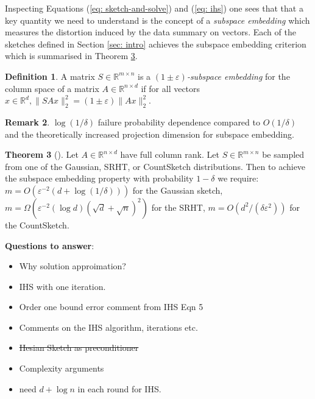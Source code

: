 \documentclass[twoside]{article}
\newcommand{\R}{\mathbb{R}}
\newcommand{\eps}{\varepsilon}
\theoremstyle{definition}\newtheorem{thm}{Theorem}[section]
\theoremstyle{definition}\newtheorem{mydef}[thm]{Definition}
\theoremstyle{definition}\newtheorem{rem}[thm]{Remark}
\theoremstyle{definition}\newtheorem{prop}[thm]{Proposition}
\theoremstyle{definition}\newtheorem{example}[thm]{Example}
\theoremstyle{definition}\newtheorem{claim}[thm]{Claim}
\theoremstyle{definition}\newtheorem{Qu}[thm]{Question}
\theoremstyle{definition}\newtheorem{Lemma}[thm]{Lemma}
\theoremstyle{definition}\newtheorem{Cor}[thm]{Corollary}
\theoremstyle{definition}\newtheorem{Fact}[]{Fact}
\begin{document}
Inspecting Equations (\ref{eq: sketch-and-solve}) and (\ref{eq: ihs}) one
sees that that a key quantity we need to understand is the concept
of a \textit{subspace embedding} which measures the distortion induced by the
data summary on vectors.
Each of the sketches defined in Section \ref{sec: intro} achieves the subspace
embedding criterion which is summarised in Theorem
\ref{thm: subspace-embedding-dims}.

\begin{mydef} \label{def: subspace-embedding}
  A matrix $S \in \R^{m \times n}$ is a \textit{$(1 \pm \eps)$-subspace embedding}
  for the column space of a matrix $A \in \R^{n \times d}$ if for all vectors
  $x \in \R^d, \|SAx\|_2^2 = (1 \pm \eps)\|Ax\|_2^2$.
\end{mydef}

\begin{rem} \label{rem: subspace-embedding-remark}
  $\log(1/\delta)$ failure probability dependence compared to $O(1/\delta)$
  and the theoretically increased projection dimension for subspace embedding.
\end{rem}



\begin{thm}[\cite{woodruff2014sketching}] \label{thm: subspace-embedding-dims}
  Let $A \in \R^{n \times d}$ have full column rank.
  Let $S \in \R^{m \times n}$ be sampled from one of the Gaussian, SRHT, or
  CountSketch distributions.
  Then to achieve the subspace embedding property with probability
  $1 - \delta$ we require:
  $m = O(\eps^{-2}(d + \log(1/\delta)))$ for the Gaussian sketch,
  $m = \Omega(\eps^{-2}(\log d) (\sqrt{d} + \sqrt{n})^2)$ for the SRHT,
  $m = O(d^2/(\delta \eps^2))$ for the CountSketch.
\end{thm}



\textbf{Questions to answer}:
\begin{itemize}
  \item Why solution approimation?
  \item IHS with one iteration.
  \item Order one bound error comment from IHS Eqn 5
  \item Comments on the IHS algorithm, iterations etc.
  \item \sout{Hesian Sketch as preconditioner}
  \item Complexity arguments
  \item need $d + \log n$ in each round for IHS.
\end{itemize}
\end{document}
